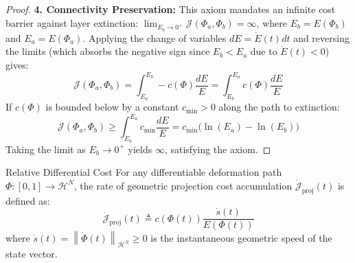\documentclass[11pt, a4paper, copyright, gdm]{google}
\newcommand{\norm}[1]{\left\lVert#1\right\rVert}
\newcommand{\calH}{\mathcal{H}}
\newcommand{\calJ}{\mathcal{J}}
\theoremstyle{definition}
\begin{document}
\begin{proof}
\vspace{0.5em}
\noindent\textbf{4. Connectivity Preservation:}
This axiom mandates an infinite cost barrier against layer extinction: $\lim_{E_b \to 0^+} \calJ(\Phi_a, \Phi_b) = \infty$, where $E_b = E(\Phi_b)$ and $E_a = E(\Phi_a)$. Applying the change of variables $dE = \dot{E}(t) dt$ and reversing the limits (which absorbs the negative sign since $E_b < E_a$ due to $\dot{E}(t)<0$) gives:
\begin{equation*}
    \calJ(\Phi_a, \Phi_b) = \int_{E_a}^{E_b} -c(\Phi) \frac{dE}{E} = \int_{E_b}^{E_a} c(\Phi) \frac{dE}{E}
\end{equation*}
If $c(\Phi)$ is bounded below by a constant $c_{\min} > 0$ along the path to extinction:
\begin{equation*}
    \calJ(\Phi_a, \Phi_b) \ge \int_{E_b}^{E_a} c_{\min} \frac{dE}{E} = c_{\min} \big( \ln(E_a) - \ln(E_b) \big)
\end{equation*}
Taking the limit as $E_b \to 0^+$ yields $\infty$, satisfying the axiom.
\end{proof}

\begin{insight}{Relative Differential Cost}
For any differentiable deformation path $\Phi: [0,1] \rightarrow \calH^N$, the rate of geometric projection cost accumulation $\dot{\calJ}_{\text{proj}}(t)$ is defined as:
\begin{equation}
\label{def:inf_weber}
    \dot{\calJ}_{\text{proj}}(t) \triangleq c(\Phi(t)) \frac{\dot{s}(t)}{E(\Phi(t))}
\end{equation}
where $\dot{s}(t) = \norm{\dot{\Phi}(t)}_{\calH^N} \ge 0$ is the instantaneous geometric speed of the state vector.
\end{insight}
\end{document}
